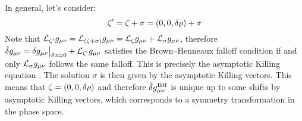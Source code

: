 \documentclass[12pt,a4paper,utf8]{article}
\newcommand{\tvar}[1]{\mathinner{\tilde{\delta} #1}}
\begin{document}
	In general, let's consider:
	\begin{equation}
		\zeta'
		= \zeta + \sigma
		= (0,0,\mathinner{\delta \rho}) + \sigma
	\end{equation}
	Note that $
		\mathcal{L}_{\mathnormal{\zeta'}} g_{\mu\nu}
		= \mathcal{L}_{\mathnormal{(\zeta + \sigma)}} g_{\mu\nu}
		= \mathcal{L}_{\mathnormal{\zeta}} g_{\mu\nu}
			+ \mathcal{L}_{\mathnormal{\sigma}} g_{\mu\nu}
	$, therefore $
		\tvar{g_{\mu\nu}}
		= \delta g_{\mu\nu}\big|_{\var{x} = 0}
			+ \ldv{\zeta'} g_{\mu\nu}
	$ satisfies the Brown--Henneaux falloff condition if and only $
		\mathcal{L}_{\mathnormal{\sigma}} g_{\mu\nu}
	$ follows the same falloff. This is precisely the asymptotic Killing equation \cite{Brown:1986nw}. The solution $\sigma$ is then given by the asymptotic Killing vectors. This means that $\zeta = (0,0,\mathinner{\delta \rho})$ and therefore $\tvar{g^\mrm{BH}_{\mu\nu}}$ is unique up to some shifts by asymptotic Killing vectors, which corresponds to a symmetry transformation in the phase space. 
	
	
	
\end{document}
